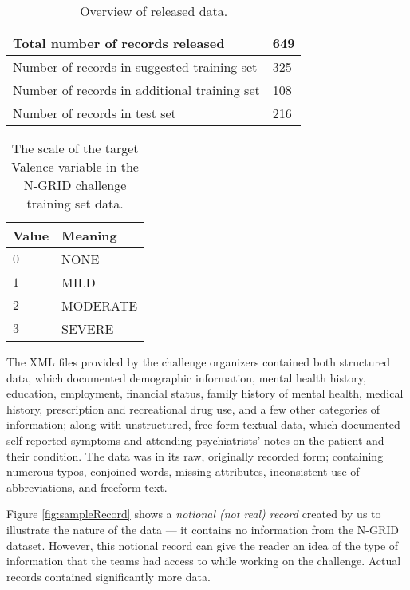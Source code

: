 \begin{table}
    \centering
    \begin{tabular}{|l|l|}
    \hline
    Total number of records released & 649  \\
    \hline
    Number of records in suggested training set    & 325  \\
    \hline
    Number of records in additional training set    & 108  \\
    \hline
    Number of records in test set   & 216 \\
    \hline
    \end{tabular}
    \caption{Overview of released data.}
    \label{tab:data1}
\end{table}


\begin{table}
\centering
    \begin{tabular}{|l|l|}
    \hline
    \textsf{Value} & \textsf{Meaning}\\
    \hline
    $0$  & \textsf{NONE}\\
    $1$  & \textsf{MILD}\\
    $2$  & \textsf{MODERATE}\\
    $3$  & \textsf{SEVERE}\\
    \hline
    \end{tabular}
    \caption{The scale of the target \textsf{Valence} variable in the N-GRID challenge training set data.}
    \label{tab:valence}
\end{table}

The  XML files provided by the challenge organizers contained both structured data, which documented
demographic information, mental health history, education, employment, financial status, family history of mental health, medical history, prescription and recreational drug use, and a few other categories of information; along with unstructured, free-form textual data, which documented self-reported symptoms and attending psychiatrists' notes on the patient and their condition. The data was in its raw, originally recorded form; containing numerous typos, conjoined words, missing attributes, inconsistent use of abbreviations, and freeform text. 

Figure \ref{fig:sampleRecord} shows a \textit{notional (not real) record} created by us to illustrate the nature
of the data --- it contains no
information from the N-GRID dataset. However, this notional record
can give the reader an idea of the type of information that the teams had access to while working on the challenge.
Actual records contained significantly more data.

